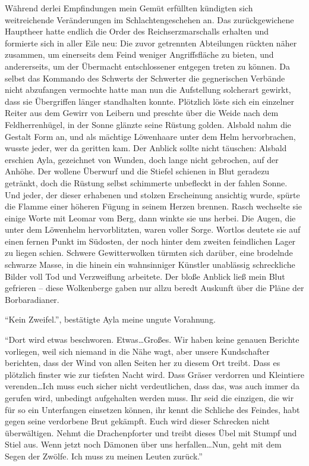 Während derlei Empfindungen mein Gemüt erfüllten kündigten sich weitreichende Veränderungen im Schlachtengeschehen an. Das zurückgewichene Hauptheer hatte endlich die Order des Reichserzmarschalls erhalten und formierte sich in aller Eile neu: Die zuvor getrennten Abteilungen rückten näher zusammen, um einerseits dem Feind weniger Angriffsfläche zu bieten, und andererseits, um der Übermacht entschlossener entgegen treten zu können. Da selbst das Kommando des Schwerts der Schwerter die gegnerischen Verbände nicht abzufangen vermochte hatte man nun die Aufstellung solcherart gewirkt, dass sie Übergriffen länger standhalten konnte. Plötzlich löste sich ein einzelner Reiter aus dem Gewirr von Leibern und preschte über die Weide nach dem Feldherrenhügel, in der Sonne glänzte seine Rüstung golden. Alsbald nahm die Gestalt Form an, und als mächtige Löwenhaare unter dem Helm hervorbrachen, wusste jeder, wer da geritten kam. Der Anblick sollte nicht täuschen: Alsbald erschien Ayla, gezeichnet von Wunden, doch lange nicht gebrochen, auf der Anhöhe. Der wollene Überwurf und die Stiefel schienen in Blut geradezu getränkt, doch die Rüstung selbst schimmerte unbefleckt in der fahlen Sonne. Und jeder, der dieser erhabenen und stolzen Erscheinung ansichtig wurde, spürte die Flamme einer höheren Fügung in seinem Herzen brennen. Rasch wechselte sie einige Worte mit Leomar vom Berg, dann winkte sie uns herbei. Die Augen, die unter dem Löwenhelm hervorblitzten, waren voller Sorge. Wortlos deutete sie auf einen fernen Punkt im Südosten, der noch hinter dem zweiten feindlichen Lager zu liegen schien. Schwere Gewitterwolken türmten sich darüber, eine brodelnde schwarze Masse, in die hinein ein wahnsinniger Künstler unablässig schreckliche Bilder voll Tod und Verzweiflung arbeitete. Der bloße Anblick ließ mein Blut gefrieren -- diese Wolkenberge gaben nur allzu beredt Auskunft über die Pläne der Borbaradianer.

``Kein Zweifel.'', bestätigte Ayla meine ungute Vorahnung.

``Dort wird etwas beschworen. Etwas\dots Großes. Wir haben keine genauen Berichte vorliegen, weil sich niemand in die Nähe wagt, aber unsere Kundschafter berichten, dass der Wind von allen Seiten her zu diesem Ort treibt. Dass es plötzlich finster wie zur tiefsten Nacht wird. Dass Gräser verdorren und Kleintiere verenden\dots Ich muss euch sicher nicht verdeutlichen, dass das, was auch immer da gerufen wird, unbedingt aufgehalten werden muss. Ihr seid die einzigen, die wir für so ein Unterfangen einsetzen können, ihr kennt die Schliche des Feindes, habt gegen seine verdorbene Brut gekämpft. Euch wird dieser Schrecken nicht überwältigen. Nehmt die Drachenpforter und treibt dieses Übel mit Stumpf und Stiel aus. Wenn jetzt noch Dämonen über uns herfallen\dots Nun, geht mit dem Segen der Zwölfe. Ich muss zu meinen Leuten zurück.''

